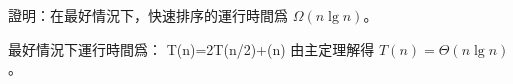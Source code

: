 \startEXERCISE
證明：在最好情況下，快速排序的運行時間爲 $\Omega(n\lg{n})$。
\stopEXERCISE

\startANSWER
最好情況下運行時間爲：
\startformula
T(n)=2T(n/2)+\Theta(n)
\stopformula
由主定理解得 $T(n)=\Theta(n\lg{n})$。
\stopANSWER

